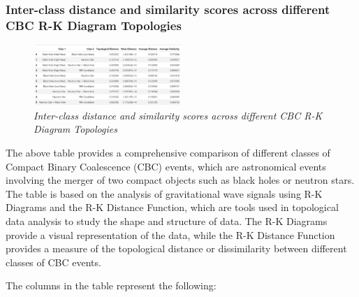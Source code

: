  \subsubsection{Inter-class distance and similarity scores across different CBC R-K Diagram Topologies}

\begin{figure}[H]
 	\centering
        \includegraphics[width=0.5\textwidth]{images/Interclass_distance_and_similarity_scores.jpg}
	\caption{\textit{Inter-class distance and similarity scores across different CBC R-K Diagram Topologies}}
	\label{fig:Inter-class_distance}
\end{figure}

The above table provides a comprehensive comparison of different classes of Compact Binary Coalescence (CBC) events, which are astronomical events involving the merger of two compact objects such as black holes or neutron stars. The table is based on the analysis of gravitational wave signals using R-K Diagrams and the R-K Distance Function, which are tools used in topological data analysis to study the shape and structure of data. The R-K Diagrams provide a visual representation of the data, while the R-K Distance Function provides a measure of the topological distance or dissimilarity between different classes of CBC events.

The columns in the table represent the following:

